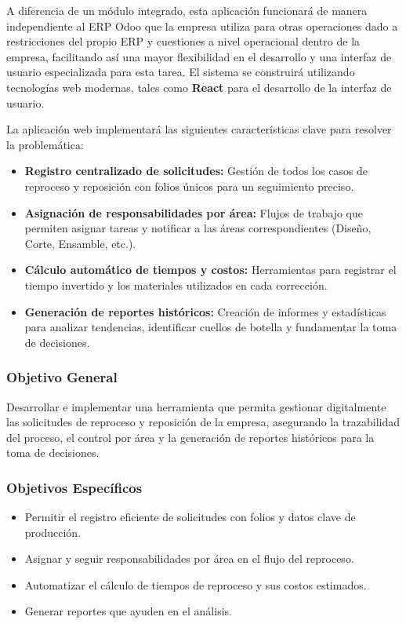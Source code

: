 \documentclass[12pt,letterpaper,spanish]{report}
\begin{document}
A diferencia de un módulo integrado, esta aplicación funcionará de manera independiente al ERP Odoo que la empresa utiliza para otras operaciones dado a restricciones del propio ERP y cuestiones a nivel operacional dentro de la empresa, facilitando así una mayor flexibilidad en el desarrollo y una interfaz de usuario especializada para esta tarea. El sistema se construirá utilizando tecnologías web modernas, tales como \textbf{React} para el desarrollo de la interfaz de usuario.

La aplicación web implementará las siguientes características clave para resolver la problemática:
\begin{itemize}
    \item \textbf{Registro centralizado de solicitudes:} Gestión de todos los casos de reproceso y reposición con folios únicos para un seguimiento preciso.
    \item \textbf{Asignación de responsabilidades por área:} Flujos de trabajo que permiten asignar tareas y notificar a las áreas correspondientes (Diseño, Corte, Ensamble, etc.).
    \item \textbf{Cálculo automático de tiempos y costos:} Herramientas para registrar el tiempo invertido y los materiales utilizados en cada corrección.
    \item \textbf{Generación de reportes históricos:} Creación de informes y estadísticas para analizar tendencias, identificar cuellos de botella y fundamentar la toma de decisiones.
\end{itemize}

\subsubsection{Objetivo General}
\label{sec:objetivo_general}

Desarrollar e implementar una herramienta que permita gestionar digitalmente las solicitudes de reproceso y reposición de la empresa, asegurando la trazabilidad del proceso, el control por área y la generación de reportes históricos para la toma de decisiones.

\subsubsection{Objetivos Específicos}
\label{sec:objetivos_especificos}

\begin{itemize}
    \item Permitir el registro eficiente de solicitudes con folios y datos clave de producción.
    \item Asignar y seguir responsabilidades por área en el flujo del reproceso.
    \item Automatizar el cálculo de tiempos de reproceso y sus costos estimados.
    \item Generar reportes que ayuden en el análisis.
\end{itemize}
\end{document}
